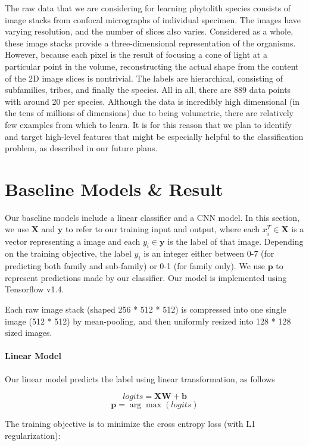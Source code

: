 \documentclass{article}
\begin{document}
The raw data that we are considering for learning phytolith species consists of image stacks from confocal micrographs of individual specimen. The images have varying resolution, and the number of slices also varies. Considered as a whole, these image stacks provide a three-dimensional representation of the organisms. However, because each pixel is the result of focusing a cone of light at a particular point in the volume, reconstructing the actual shape from the content of the 2D image slices is nontrivial.
The labels are hierarchical, consisting of subfamilies, tribes, and finally the species. All in all, there are 889 data points with around 20 per species. Although the data is incredibly high dimensional (in the tens of millions of dimensions) due to being volumetric, there are relatively few examples from which to learn. It is for this reason that we plan to identify and target high-level features that might be especially helpful to the classification problem, as described in our future plans.


\section{Baseline Models \& Result}

Our baseline models include a linear classifier and a CNN model. In this section, we use $\mathbf{X}$ and $\mathbf{y}$ to refer to our training input and output, where each ${x}_i^T\in \mathbf{X}$ is a vector representing a image and each ${y_i}\in \mathbf{y}$ is the label of that image. Depending on the training objective, the label $y_i$ is an integer either between 0-7 (for predicting both family and sub-family) or 0-1 (for family only). We use $\mathbf{p}$ to represent predictions made by our classifier. Our model is implemented using Tensorflow v1.4.

Each raw image stack (shaped 256 * 512 * 512) is compressed into one single image (512 * 512) by mean-pooling, and then uniformly resized into 128 * 128 sized images.

\paragraph{Linear Model}

Our linear model predicts the label using linear transformation, as follows

$$\mathit{logits} = \mathbf{X} \mathbf{W} + \mathbf{b}$$
$$\mathbf{p} = \arg\max(\mathit{logits})$$


The training objective is to minimize the cross entropy loss (with L1 regularization):
\end{document}
